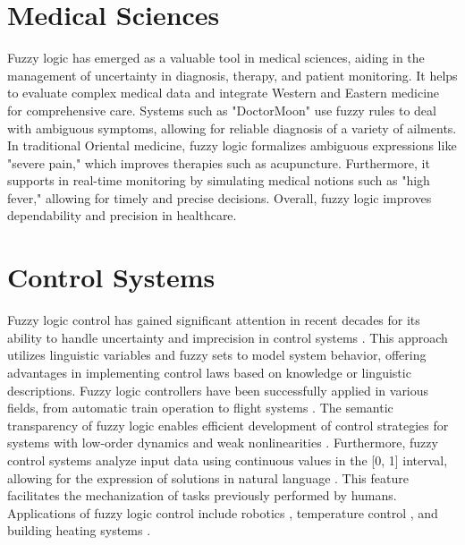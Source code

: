 \documentclass[a4paper,12pt]{report}
\begin{document}
\section{Medical Sciences}
Fuzzy logic has emerged as a valuable tool in medical sciences, aiding in the management of uncertainty in diagnosis, therapy, and patient monitoring. It helps to evaluate complex medical data and integrate Western and Eastern medicine for comprehensive care. Systems such as "DoctorMoon" use fuzzy rules to deal with ambiguous symptoms, allowing for reliable diagnosis of a variety of ailments. In traditional Oriental medicine, fuzzy logic formalizes ambiguous expressions like "severe pain," which improves therapies such as acupuncture. Furthermore, it supports in real-time monitoring by simulating medical notions such as "high fever," allowing for timely and precise decisions. Overall, fuzzy logic improves dependability and precision in healthcare. \cite{phuong2001fuzzy}

\section{Control Systems}
Fuzzy logic control has gained significant attention in recent decades for its ability to handle uncertainty and imprecision in control systems \cite{nazemizadeh2014application}. This approach utilizes linguistic variables and fuzzy sets to model system behavior, offering advantages in implementing control laws based on knowledge or linguistic descriptions. Fuzzy logic controllers have been successfully applied in various fields, from automatic train operation to flight systems \cite{langari1999past}. The semantic transparency of fuzzy logic enables efficient development of control strategies for systems with low-order dynamics and weak nonlinearities \cite{langari1999past}. Furthermore, fuzzy control systems analyze input data using continuous values in the [0, 1] interval, allowing for the expression of solutions in natural language \cite{voskoglou2019methods}. This feature facilitates the mechanization of tasks previously performed by humans. Applications of fuzzy logic control include robotics \cite{nazemizadeh2014application}, temperature control , and building heating systems \cite{voskoglou2019methods}.
\end{document}
